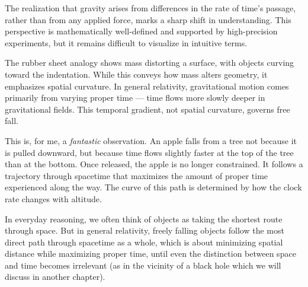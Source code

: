 \begin{commentary}

The realization that gravity arises from differences in the rate of time’s passage, rather than from any applied force, marks a sharp shift in understanding. This perspective is mathematically well-defined and supported by high-precision experiments, but it remains difficult to visualize in intuitive terms.

The rubber sheet analogy shows mass distorting a surface, with objects curving toward the indentation. While this conveys how mass alters geometry, it emphasizes spatial curvature. In general relativity, gravitational motion comes primarily from varying proper time — time flows more slowly deeper in gravitational fields. This temporal gradient, not spatial curvature, governs free fall.

This is, for me, a \textit{fantastic} observation. An apple falls from a tree not because it is pulled downward, but because time flows slightly faster at the top of the tree than at the bottom. Once released, the apple is no longer constrained. It follows a trajectory through spacetime that maximizes the amount of proper time experienced along the way. The curve of this path is determined by how the clock rate changes with altitude.

In everyday reasoning, we often think of objects as taking the shortest route through space. But in general relativity, freely falling objects follow the most direct path through spacetime as a whole, which is about minimizing spatial distance while maximizing proper time, until even the distinction between space and time becomes irrelevant (as in the vicinity of a black hole which we will discuss in another chapter).

\end{commentary}


